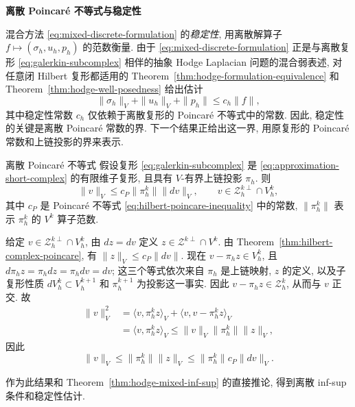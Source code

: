 \medskip\noindent\textbf{{离散 Poincaré 不等式与稳定性}}\par
{混合方法 \eqref{eq:mixed-discrete-formulation} 的\emph{稳定性}, 用离散解算子 $f\mapsto(\sigma_h,u_h,p_h)$ 的范数衡量. 由于 \eqref{eq:mixed-discrete-formulation} 正是与离散复形 \eqref{eq:galerkin-subcomplex} 相伴的抽象 Hodge Laplacian 问题的混合弱表述, 对任意闭 Hilbert 复形都适用的 Theorem~\ref{thm:hodge-formulation-equivalence} 和 Theorem~\ref{thm:hodge-well-posedness} 给出估计}
\begin{equation}\label{eq:discrete-mixed-stability}
\|\sigma_h\|_V+\|u_h\|_V+\|p_h\|\leq c_h\|f\|,
\end{equation}
{其中稳定性常数 $c_h$ 仅依赖于离散复形的 Poincaré 不等式中的常数. 因此, 稳定性的关键是离散 Poincaré 常数的界. 下一个结果正给出这一界, 用原复形的 Poincaré 常数和上链投影的界来表示.}


\begin{Theorem}{{离散 Poincaré 不等式}}\label{thm:discrete-poincare}
{假设复形 \eqref{eq:galerkin-subcomplex} 是 \eqref{eq:approximation-short-complex} 的有限维子复形, 且具有 $V$-有界上链投影 $\pi_h$. 则}
\[
\|v\|_V\leq c_P\|\pi_h^k\|\|dv\|_V,\qquad v\in\mathcal Z_h^{k\perp}\cap V_h^k,
\]
{其中 $c_P$ 是 Poincaré 不等式 \eqref{eq:hilbert-poincare-inequality} 中的常数, $\|\pi_h^k\|$ 表示 $\pi_h^k$ 的 $V^k$ 算子范数.}
\end{Theorem}

\begin{Proof}
{给定 $v\in\mathcal Z_h^{k\perp}\cap V_h^k$, 由 $dz=dv$ 定义 $z\in\mathcal Z^{k\perp}\cap V^k$. 由 Theorem~\ref{thm:hilbert-complex-poincare}, 有 $\|z\|_V\leq c_P\|dv\|$. 现在 $v-\pi_hz\in V_h^k$, 且 $d\pi_hz=\pi_hdz=\pi_hdv=dv$; 这三个等式依次来自 $\pi_h$ 是上链映射, $z$ 的定义, 以及子复形性质 $dV_h^k\subset V_h^{k+1}$ 和 $\pi_h^{k+1}$ 为投影这一事实. 因此 $v-\pi_hz\in\mathcal Z_h^k$, 从而与 $v$ 正交. 故}
\[
\begin{aligned}
\|v\|_V^2&=\langle v,\pi_h^kz\rangle_V+\langle v,v-\pi_h^kz\rangle_V\\
&=\langle v,\pi_h^kz\rangle_V\leq\|v\|_V\|\pi_h^k\|\|z\|_V,
\end{aligned}
\]
{因此}
\[
\|v\|_V\leq\|\pi_h^k\|\|z\|_V\leq\|\pi_h^k\|c_P\|dv\|_V.
\]
\end{Proof}

{作为此结果和 Theorem~\ref{thm:hodge-mixed-inf-sup} 的直接推论, 得到离散 inf-sup 条件和稳定性估计.}

